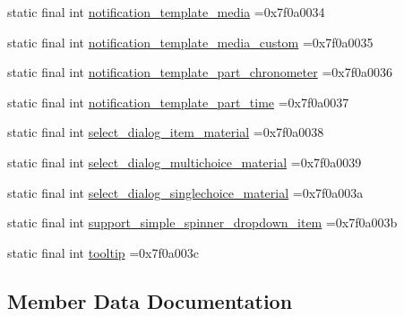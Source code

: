 \begin{DoxyCompactItemize}
\item 
static final int \mbox{\hyperlink{classbr_1_1unb_1_1cic_1_1mp_1_1marketmaster_1_1test_1_1R_1_1layout_a00f0d1cd87e3638ba1efed5b5ca7d094}{notification\+\_\+template\+\_\+media}} =0x7f0a0034
\item 
static final int \mbox{\hyperlink{classbr_1_1unb_1_1cic_1_1mp_1_1marketmaster_1_1test_1_1R_1_1layout_ab7a5456e2fa90a5dadcecd875c444791}{notification\+\_\+template\+\_\+media\+\_\+custom}} =0x7f0a0035
\item 
static final int \mbox{\hyperlink{classbr_1_1unb_1_1cic_1_1mp_1_1marketmaster_1_1test_1_1R_1_1layout_a7d037aacf513c8d5698eb3ab750edd18}{notification\+\_\+template\+\_\+part\+\_\+chronometer}} =0x7f0a0036
\item 
static final int \mbox{\hyperlink{classbr_1_1unb_1_1cic_1_1mp_1_1marketmaster_1_1test_1_1R_1_1layout_a14d5506ac1244a9ad2b67c1ca59a5f30}{notification\+\_\+template\+\_\+part\+\_\+time}} =0x7f0a0037
\item 
static final int \mbox{\hyperlink{classbr_1_1unb_1_1cic_1_1mp_1_1marketmaster_1_1test_1_1R_1_1layout_a1fd1c96632174518df501dbbcb17679c}{select\+\_\+dialog\+\_\+item\+\_\+material}} =0x7f0a0038
\item 
static final int \mbox{\hyperlink{classbr_1_1unb_1_1cic_1_1mp_1_1marketmaster_1_1test_1_1R_1_1layout_a0fcc379bd40a08d60718aaeea7b5f9ee}{select\+\_\+dialog\+\_\+multichoice\+\_\+material}} =0x7f0a0039
\item 
static final int \mbox{\hyperlink{classbr_1_1unb_1_1cic_1_1mp_1_1marketmaster_1_1test_1_1R_1_1layout_ad7f76d6b37425fc44f8dd95abbfa9bf0}{select\+\_\+dialog\+\_\+singlechoice\+\_\+material}} =0x7f0a003a
\item 
static final int \mbox{\hyperlink{classbr_1_1unb_1_1cic_1_1mp_1_1marketmaster_1_1test_1_1R_1_1layout_a5819f24006b2fedf0d59ab0af4bdae49}{support\+\_\+simple\+\_\+spinner\+\_\+dropdown\+\_\+item}} =0x7f0a003b
\item 
static final int \mbox{\hyperlink{classbr_1_1unb_1_1cic_1_1mp_1_1marketmaster_1_1test_1_1R_1_1layout_af40ecd2163f770fd0050c99ff08abe17}{tooltip}} =0x7f0a003c
\end{DoxyCompactItemize}


\subsection{Member Data Documentation}
\mbox{\label{classbr_1_1unb_1_1cic_1_1mp_1_1marketmaster_1_1test_1_1R_1_1layout_a4507ad54f6be2056c89e6401e9c3655a}} 
